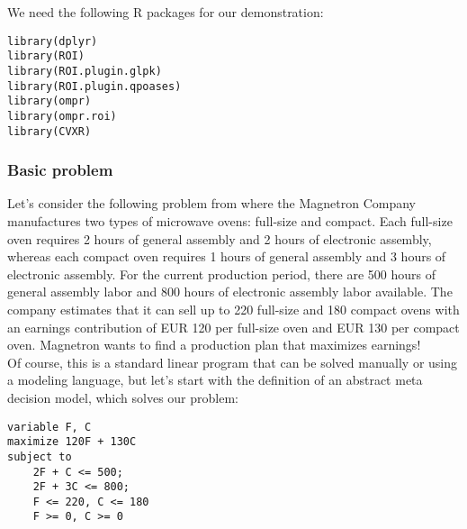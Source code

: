 \documentclass[a4paper]{article}\usepackage[]{graphicx}\usepackage[]{color}
\makeatletter
\newcommand{\hlstd}[1]{\textcolor[rgb]{0,0,0}{#1}}%
\newcommand{\hlkwd}[1]{\textcolor[rgb]{0,0,0}{#1}}%
\newenvironment{kframe}{%
 \def\at@end@of@kframe{}%
 \ifinner\ifhmode%
  \def\at@end@of@kframe{\end{minipage}}%
  \begin{minipage}{\columnwidth}%
 \fi\fi%
 \def\FrameCommand##1{\hskip\@totalleftmargin \hskip-\fboxsep
 \colorbox{shadecolor}{##1}\hskip-\fboxsep
     \hskip-\linewidth \hskip-\@totalleftmargin \hskip\columnwidth}%
 \MakeFramed {\advance\hsize-\width
   \@totalleftmargin\z@ \linewidth\hsize
   \@setminipage}}%
 {\par\unskip\endMakeFramed%
 \at@end@of@kframe}
\newenvironment{knitrout}{}{} %
\makeatother
\begin{document}
We need the following R packages for our demonstration:

\begin{knitrout}
\color{fgcolor}\begin{kframe}
\begin{alltt}
\hlkwd{library}\hlstd{(dplyr)}
\hlkwd{library}\hlstd{(ROI)}
\hlkwd{library}\hlstd{(ROI.plugin.glpk)}
\hlkwd{library}\hlstd{(ROI.plugin.qpoases)}
\hlkwd{library}\hlstd{(ompr)}
\hlkwd{library}\hlstd{(ompr.roi)}
\hlkwd{library}\hlstd{(CVXR)}
\end{alltt}
\end{kframe}
\end{knitrout}


\subsubsection{Basic problem}
Let's consider the following problem from \cite{BertsimasFreund2000} where 
the Magnetron Company manufactures two types of microwave ovens: 
full-size and compact. 
Each full-size oven requires 2 hours of general assembly and 2 hours of 
electronic assembly, whereas each compact oven requires 1 hours of general 
assembly and 3 hours of electronic assembly. 
For the current production period, there are 500 hours of general assembly 
labor and 800 hours of electronic assembly labor available. 
The company estimates that it can sell up to 220 full-size and 180 compact 
ovens with an earnings contribution of EUR 120 per full-size oven and 
EUR 130 per compact oven. 
Magnetron wants to find a production plan that maximizes earnings! \\
 
Of course, this is a standard linear program that can be solved manually 
or using a modeling language, but let's start with the definition of an 
abstract meta decision model, which solves our problem:
\begin{verbatim}
variable F, C
maximize 120F + 130C
subject to
    2F + C <= 500;
    2F + 3C <= 800;
    F <= 220, C <= 180
    F >= 0, C >= 0
\end{verbatim}
\end{document}
